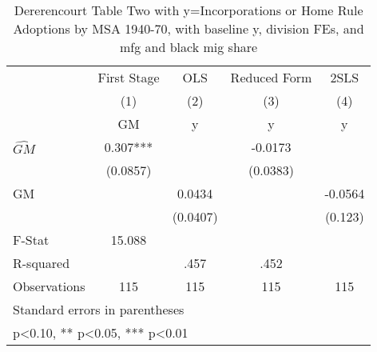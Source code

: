 \begin{table}[htbp]\centering
\def\sym#1{\ifmmode^{#1}\else\(^{#1}\)\fi}
\caption{Dererencourt Table Two with y=Incorporations or Home Rule Adoptions by MSA 1940-70, with baseline y, division FEs, and mfg and black mig share}
\begin{tabular}{l*{4}{c}}
\toprule
                    & First Stage   &         OLS   &Reduced Form   &        2SLS   \\
                    &\multicolumn{1}{c}{(1)}&\multicolumn{1}{c}{(2)}&\multicolumn{1}{c}{(3)}&\multicolumn{1}{c}{(4)}\\
                    &\multicolumn{1}{c}{GM}&\multicolumn{1}{c}{y}&\multicolumn{1}{c}{y}&\multicolumn{1}{c}{y}\\
\midrule
$\hat{GM}$          &       0.307***&               &     -0.0173   &               \\
                    &    (0.0857)   &               &    (0.0383)   &               \\
\addlinespace
GM                  &               &      0.0434   &               &     -0.0564   \\
                    &               &    (0.0407)   &               &     (0.123)   \\
\midrule
F-Stat              &      15.088   &               &               &               \\
R-squared           &               &        .457   &        .452   &               \\
Observations        &         115   &         115   &         115   &         115   \\
\bottomrule
\multicolumn{5}{l}{\footnotesize Standard errors in parentheses}\\
\multicolumn{5}{l}{\footnotesize * p<0.10, ** p<0.05, *** p<0.01}\\
\end{tabular}
\end{table}
